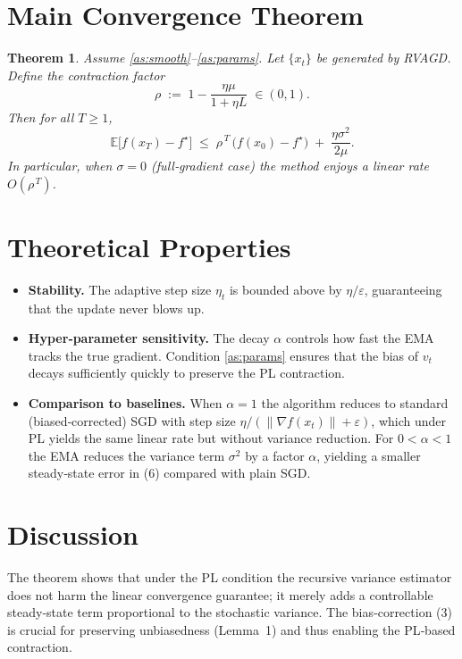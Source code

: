 \documentclass{article}
\newtheorem{theorem}{Theorem}
\newcommand{\E}{\mathbb{E}}
\newcommand{\norm}[1]{\left\lVert #1\right\rVert}
\begin{document}
\section*{Main Convergence Theorem}
\begin{theorem}\label{thm:linear}
Assume \ref{as:smooth}–\ref{as:params}. Let $\{x_t\}$ be generated by
RVAGD. Define the contraction factor
\[
\rho\;:=\;1-\frac{\eta\mu}{1+\eta L}\;\in(0,1).
\]
Then for all $T\ge 1$,
\[
\E\bigl[f(x_T)-f^\star\bigr]\;\le\;
\rho^{\,T}\,\bigl(f(x_0)-f^\star\bigr)
\;+\;
\frac{\eta\sigma^2}{2\mu}.
\tag{6}
\]
In particular, when $\sigma=0$ (full‑gradient case) the method enjoys a
linear rate $O(\rho^{\,T})$.
\end{theorem}

\section*{Theoretical Properties}
\begin{itemize}
\item \textbf{Stability.} The adaptive step size $\eta_t$ is bounded above by
$\eta/\varepsilon$, guaranteeing that the update never blows up.
\item \textbf{Hyper‑parameter sensitivity.}
  The decay $\alpha$ controls how fast the EMA tracks the true gradient.
  Condition \ref{as:params} ensures that the bias of $v_t$ decays
  sufficiently quickly to preserve the PL contraction.
\item \textbf{Comparison to baselines.}
  When $\alpha=1$ the algorithm reduces to standard (biased‑corrected) SGD
  with step size $\eta/(\norm{\nabla f(x_t)}+\varepsilon)$, which under
  PL yields the same linear rate but without variance reduction.
  For $0<\alpha<1$ the EMA reduces the variance term
  $\sigma^2$ by a factor $\alpha$, yielding a smaller steady‑state error
  in (6) compared with plain SGD.
\end{itemize}

\section*{Discussion}
The theorem shows that under the PL condition the recursive variance
estimator does not harm the linear convergence guarantee; it merely adds
a controllable steady‑state term proportional to the stochastic variance.
The bias‑correction (3) is crucial for preserving unbiasedness (Lemma~1)
and thus enabling the PL‑based contraction.

\newpage
\end{document}
